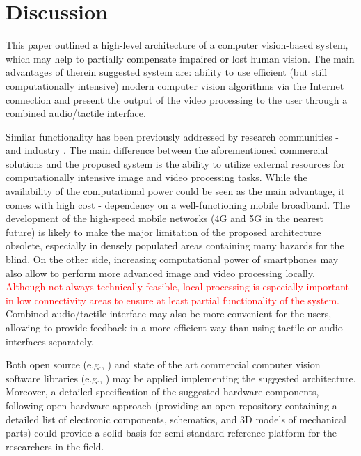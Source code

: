 \documentclass[10pt,conference,compsocconf]{IEEEtran}
\begin{document}
 
\section{Discussion}
\label{sec:discussion}


This paper outlined a high-level architecture of a computer vision-based system, which may help to partially compensate impaired or lost human vision. The main advantages of therein suggested system are: ability to use efficient (but still computationally intensive) modern computer vision algorithms via the Internet connection and present the output of the video processing to the user through a combined audio/tactile interface. 

Similar functionality has been previously addressed by research communities \cite{Caraiman}-\cite{Zientara} and industry \cite{orcam}\cite{horus}. The main difference between the aforementioned commercial solutions and the proposed system is the ability to utilize external resources for computationally intensive image and video processing tasks. While the availability of the computational power could be seen as the main advantage, it comes with high cost - dependency on a well-functioning mobile broadband. The development of the high-speed mobile networks (4G and 5G in the nearest future) is likely to make the major limitation of the proposed architecture obsolete, especially in densely populated areas containing many hazards for the blind. On the other side, increasing computational power of smartphones may also allow to perform more advanced image and video processing locally. \textcolor{red}{Although not always technically feasible, local  processing is especially important in low connectivity areas to ensure at least partial functionality of the system.} Combined audio/tactile interface may also be more convenient for the users, allowing to provide feedback in a more efficient way than using tactile or audio interfaces separately. 

Both open source (e.g., \cite{Tensorflow}) and state of the art commercial computer vision software libraries (e.g., \cite{Verilook}) may be applied implementing the suggested architecture. Moreover, a detailed specification of the suggested hardware components, following open hardware approach (providing an open repository containing a detailed list of electronic components, schematics, and 3D models of mechanical parts) could provide a solid basis for semi-standard reference platform for the researchers in the field.
\end{document}
